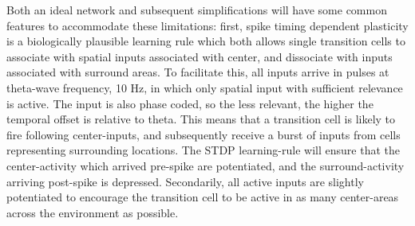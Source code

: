 \documentclass{article}
\begin{document}
    Both an ideal network and subsequent simplifications will have some common features to accommodate these limitations: first, spike timing dependent plasticity is a biologically plausible learning rule which both allows single transition cells to associate with spatial inputs associated with center, and dissociate with inputs associated with surround areas. To facilitate this, all inputs arrive in pulses at theta-wave frequency, 10 Hz, in which only spatial input with sufficient relevance is active. The input is also phase coded, so the less relevant, the higher the temporal offset is relative to theta. This means that a transition cell is likely to fire following center-inputs, and subsequently receive a burst of inputs from cells representing surrounding locations. The STDP learning-rule will ensure that the center-activity which arrived pre-spike are potentiated, and the surround-activity arriving post-spike is depressed. Secondarily, all active inputs are slightly potentiated to encourage the transition cell to be active in as many center-areas across the environment as possible.
\end{document}
